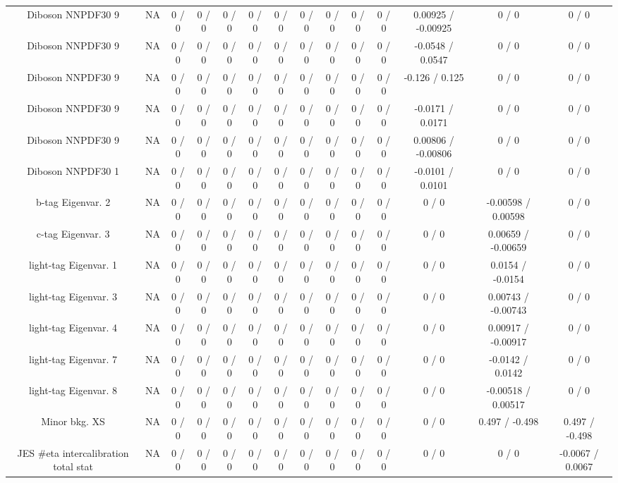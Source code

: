 \documentclass[10pt]{article}
\begin{document}
\begin{table}[htbp]
\begin{center}
\begin{tabular}{|c|c|c|c|c|c|c|c|c|c|c|c|c|c|}
  Diboson NNPDF30 9 &    NA    & 0 / 0 & 0 / 0 & 0 / 0 & 0 / 0 & 0 / 0 & 0 / 0 & 0 / 0 & 0 / 0 & 0 / 0 & 0.00925 / -0.00925 & 0 / 0 & 0 / 0 \\ 
  Diboson NNPDF30 9 &    NA    & 0 / 0 & 0 / 0 & 0 / 0 & 0 / 0 & 0 / 0 & 0 / 0 & 0 / 0 & 0 / 0 & 0 / 0 & -0.0548 / 0.0547 & 0 / 0 & 0 / 0 \\ 
  Diboson NNPDF30 9 &    NA    & 0 / 0 & 0 / 0 & 0 / 0 & 0 / 0 & 0 / 0 & 0 / 0 & 0 / 0 & 0 / 0 & 0 / 0 & -0.126 / 0.125 & 0 / 0 & 0 / 0 \\ 
  Diboson NNPDF30 9 &    NA    & 0 / 0 & 0 / 0 & 0 / 0 & 0 / 0 & 0 / 0 & 0 / 0 & 0 / 0 & 0 / 0 & 0 / 0 & -0.0171 / 0.0171 & 0 / 0 & 0 / 0 \\ 
  Diboson NNPDF30 9 &    NA    & 0 / 0 & 0 / 0 & 0 / 0 & 0 / 0 & 0 / 0 & 0 / 0 & 0 / 0 & 0 / 0 & 0 / 0 & 0.00806 / -0.00806 & 0 / 0 & 0 / 0 \\ 
  Diboson NNPDF30 1 &    NA    & 0 / 0 & 0 / 0 & 0 / 0 & 0 / 0 & 0 / 0 & 0 / 0 & 0 / 0 & 0 / 0 & 0 / 0 & -0.0101 / 0.0101 & 0 / 0 & 0 / 0 \\ 
  b-tag Eigenvar. 2 &    NA    & 0 / 0 & 0 / 0 & 0 / 0 & 0 / 0 & 0 / 0 & 0 / 0 & 0 / 0 & 0 / 0 & 0 / 0 & 0 / 0 & -0.00598 / 0.00598 & 0 / 0 \\ 
  c-tag Eigenvar. 3 &    NA    & 0 / 0 & 0 / 0 & 0 / 0 & 0 / 0 & 0 / 0 & 0 / 0 & 0 / 0 & 0 / 0 & 0 / 0 & 0 / 0 & 0.00659 / -0.00659 & 0 / 0 \\ 
  light-tag Eigenvar. 1 &    NA    & 0 / 0 & 0 / 0 & 0 / 0 & 0 / 0 & 0 / 0 & 0 / 0 & 0 / 0 & 0 / 0 & 0 / 0 & 0 / 0 & 0.0154 / -0.0154 & 0 / 0 \\ 
  light-tag Eigenvar. 3 &    NA    & 0 / 0 & 0 / 0 & 0 / 0 & 0 / 0 & 0 / 0 & 0 / 0 & 0 / 0 & 0 / 0 & 0 / 0 & 0 / 0 & 0.00743 / -0.00743 & 0 / 0 \\ 
  light-tag Eigenvar. 4 &    NA    & 0 / 0 & 0 / 0 & 0 / 0 & 0 / 0 & 0 / 0 & 0 / 0 & 0 / 0 & 0 / 0 & 0 / 0 & 0 / 0 & 0.00917 / -0.00917 & 0 / 0 \\ 
  light-tag Eigenvar. 7 &    NA    & 0 / 0 & 0 / 0 & 0 / 0 & 0 / 0 & 0 / 0 & 0 / 0 & 0 / 0 & 0 / 0 & 0 / 0 & 0 / 0 & -0.0142 / 0.0142 & 0 / 0 \\ 
  light-tag Eigenvar. 8 &    NA    & 0 / 0 & 0 / 0 & 0 / 0 & 0 / 0 & 0 / 0 & 0 / 0 & 0 / 0 & 0 / 0 & 0 / 0 & 0 / 0 & -0.00518 / 0.00517 & 0 / 0 \\ 
  Minor bkg. XS &    NA    & 0 / 0 & 0 / 0 & 0 / 0 & 0 / 0 & 0 / 0 & 0 / 0 & 0 / 0 & 0 / 0 & 0 / 0 & 0 / 0 & 0.497 / -0.498 & 0.497 / -0.498 \\ 
  JES #eta intercalibration total stat &    NA    & 0 / 0 & 0 / 0 & 0 / 0 & 0 / 0 & 0 / 0 & 0 / 0 & 0 / 0 & 0 / 0 & 0 / 0 & 0 / 0 & 0 / 0 & -0.0067 / 0.0067 \\ 

\end{tabular}
\end{center}
\end{table}
\end{document}
